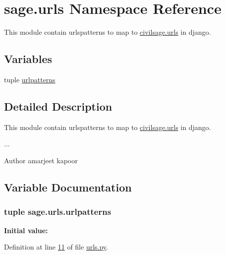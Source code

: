 \hypertarget{namespacesage_1_1urls}{}\section{sage.\+urls Namespace Reference}
\label{namespacesage_1_1urls}


This module contain urlspatterns to map to \hyperlink{namespacecivilsage_1_1urls}{civilsage.\+urls} in django.  


\subsection*{Variables}
\begin{DoxyCompactItemize}
\item 
tuple \hyperlink{namespacesage_1_1urls_a5c86cdc04e09bcea3285cc79e9c83220}{urlpatterns}
\end{DoxyCompactItemize}


\subsection{Detailed Description}
This module contain urlspatterns to map to \hyperlink{namespacecivilsage_1_1urls}{civilsage.\+urls} in django. 

... \begin{DoxyAuthor}{Author}
amarjeet kapoor 
\end{DoxyAuthor}


\subsection{Variable Documentation}
\hypertarget{namespacesage_1_1urls_a5c86cdc04e09bcea3285cc79e9c83220}{}
\subsubsection[{urlpatterns}]{\setlength{\rightskip}{0pt plus 5cm}tuple sage.\+urls.\+urlpatterns}\label{namespacesage_1_1urls_a5c86cdc04e09bcea3285cc79e9c83220}
{\bfseries Initial value\+:}


Definition at line \hyperlink{sage_2urls_8py_source_l00011}{11} of file \hyperlink{sage_2urls_8py_source}{urls.\+py}.

